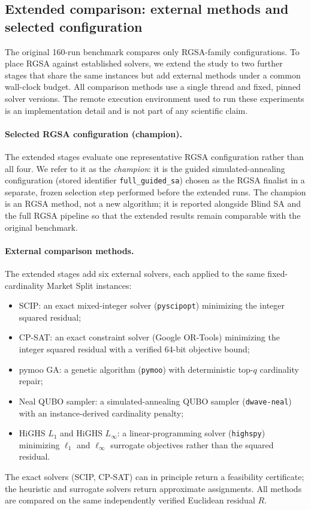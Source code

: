 \documentclass[11pt]{article}
\begin{document}
\subsection{Extended comparison: external methods and selected configuration}
The original 160-run benchmark compares only RGSA-family configurations. To place RGSA against established solvers, we extend the study to two further stages that share the same instances but add external methods under a common wall-clock budget. All comparison methods use a single thread and fixed, pinned solver versions. The remote execution environment used to run these experiments is an implementation detail and is not part of any scientific claim.

\paragraph{Selected RGSA configuration (champion).} The extended stages evaluate one representative RGSA configuration rather than all four. We refer to it as the \emph{champion}: it is the guided simulated-annealing configuration (stored identifier \texttt{full\_guided\_sa}) chosen as the RGSA finalist in a separate, frozen selection step performed before the extended runs. The champion is an RGSA method, not a new algorithm; it is reported alongside Blind SA and the full RGSA pipeline so that the extended results remain comparable with the original benchmark.

\paragraph{External comparison methods.} The extended stages add six external solvers, each applied to the same fixed-cardinality Market Split instances:
\begin{itemize}
  \item SCIP: an exact mixed-integer solver (\texttt{pyscipopt}) minimizing the integer squared residual;
  \item CP-SAT: an exact constraint solver (Google OR-Tools) minimizing the integer squared residual with a verified 64-bit objective bound;
  \item pymoo GA: a genetic algorithm (\texttt{pymoo}) with deterministic top-$q$ cardinality repair;
  \item Neal QUBO sampler: a simulated-annealing QUBO sampler (\texttt{dwave-neal}) with an instance-derived cardinality penalty;
  \item HiGHS $L_1$ and HiGHS $L_\infty$: a linear-programming solver (\texttt{highspy}) minimizing $\ell_1$ and $\ell_\infty$ surrogate objectives rather than the squared residual.
\end{itemize}
The exact solvers (SCIP, CP-SAT) can in principle return a feasibility certificate; the heuristic and surrogate solvers return approximate assignments. All methods are compared on the same independently verified Euclidean residual $R$.
\end{document}
